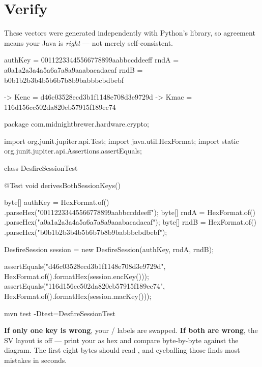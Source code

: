 \section{Verify}

These vectors were generated independently with Python's 
library, so agreement means your Java is \emph{right} --- not merely
self-consistent.

\begin{trace}
authKey = 00112233445566778899aabbccddeeff
rndA    = a0a1a2a3a4a5a6a7a8a9aaabacadaeaf
rndB    = b0b1b2b3b4b5b6b7b8b9babbbcbdbebf

-> Kenc  = d46c03528ecd3b1f1148e708d3e9729d
-> Kmac  = 116d156cc502da820eb57915f189ec74
\end{trace}

\begin{jcode}
package com.midnightbrewer.hardware.crypto;

import org.junit.jupiter.api.Test;
import java.util.HexFormat;
import static org.junit.jupiter.api.Assertions.assertEquals;

class DesfireSessionTest {

    @Test
    void derivesBothSessionKeys() {
        byte[] authKey = HexFormat.of()
                .parseHex("00112233445566778899aabbccddeeff");
        byte[] rndA = HexFormat.of()
                .parseHex("a0a1a2a3a4a5a6a7a8a9aaabacadaeaf");
        byte[] rndB = HexFormat.of()
                .parseHex("b0b1b2b3b4b5b6b7b8b9babbbcbdbebf");

        DesfireSession session = new DesfireSession(authKey, rndA, rndB);

        assertEquals("d46c03528ecd3b1f1148e708d3e9729d",
                HexFormat.of().formatHex(session.encKey()));
        assertEquals("116d156cc502da820eb57915f189ec74",
                HexFormat.of().formatHex(session.macKey()));
    }
}
\end{jcode}

\begin{verifybox}
\begin{shell}
mvn test -Dtest=DesfireSessionTest
\end{shell}
\textbf{If only one key is wrong}, your / labels are
swapped. \textbf{If both are wrong}, the SV layout is off --- print your 
as hex and compare byte-by-byte against the diagram. The first eight bytes should
read , and eyeballing those finds most mistakes in
seconds.
\end{verifybox}

